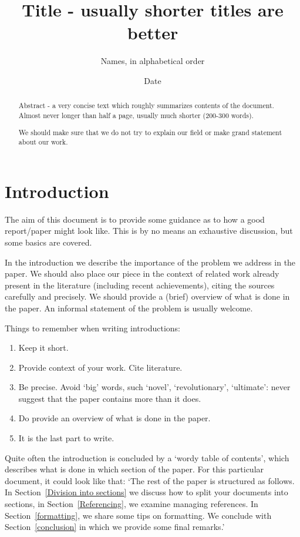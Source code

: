 \documentclass[12pt,oneside]{article}
\title{Title - usually shorter titles are better}
\date{ Date }
\author{Names, in alphabetical order}
\begin{document}
  \maketitle

  \begin{abstract}Abstract - a very concise text which roughly summarizes contents of the document.  Almost never longer than half a page, usually much shorter (200-300 words).
  
We should make sure that we do not try to explain our field or make grand statement about our work.
   \end{abstract}


  \tableofcontents
 \newpage

\section{Introduction}
The aim of this document is to provide some guidance as to how a good report/paper might look like. 
This is by no means an  exhaustive discussion, but some basics are covered. 

In the introduction we describe the importance of the problem we address in the paper. We should also place our piece in the context of related work already present in the literature (including recent achievements), citing the sources carefully and precisely.
We should provide a (brief) overview of what is done in the paper. 
An informal statement of the problem is usually welcome.



Things to remember when writing introductions:
\begin{enumerate}
\item Keep it short.
\item Provide context of your work. Cite literature.
\item Be precise. Avoid `big' words, such `novel', `revolutionary', `ultimate': never suggest that the paper contains more than it does.
\item Do provide an overview of what is done in the paper.
\item It is the last part to write.
\end{enumerate}

Quite often the introduction is concluded by a `wordy table of contents', which describes what is done in which section of the paper.
For this particular document, it could look like that:
`The rest of the paper is structured as follows. In Section~\ref{Division into sections} we discuss how to split your documents into sections, in Section~\ref{Referencing}, we examine  managing  references. In Section~\ref{formatting}, we share some tips on formatting. We conclude with Section~\ref{conclusion} in which we provide some final remarks.'
\end{document}
